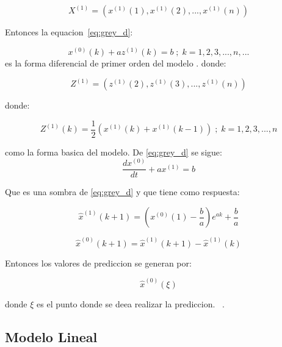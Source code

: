 \documentclass[a4paper,10pt]{article}
\begin{document}
\begin{equation}
 X^{(1)} = \left( x^{(1)}(1), x^{(1)}(2),..., x^{(1)}(n) \right)
\end{equation}

Entonces la equacion~\ref{eq:grey_d}:

\begin{equation}
 x^{(0)} (k) + az^{(1)} (k) = b \; ; \; k = 1,2,3,...,n,...
 \label{eq:grey_d}
\end{equation}
es la forma diferencial de primer orden del modelo \gm. donde:

\begin{equation}
  Z^{(1)} = \left( z^{(1)}(2), z^{(1)}(3),..., z^{(1)}(n) \right)
\end{equation}

donde:

\begin{equation}
 Z^{(1)} (k) = \frac{1}{2} ( x^{(1)}(k) + x^{(1)}(k-1) ) \; ; \;
 k = 1,2,3,...,n
\end{equation}

como la forma basica del modelo.
De \ref{eq:grey_d} se sigue:
\begin{equation}
 \frac{d x^{(0)}}{dt} + ax^{(1)} = b
 \label{eq:grey_s}
\end{equation}

Que es una sombra de \ref{eq:grey_d} y que tiene como respuesta:

\begin{equation}
\widehat{x}^{(1)} (k + 1) = \left( x^{(0)} (1) - \frac{b}{a} \right) e^{ak} + \frac{b}{a}
\end{equation}



\begin{equation}
 \widehat{x}^{(0)} (k + 1) = \widehat{x}^{(1)} (k + 1) - \widehat{x}^{(1)} (k)
\end{equation}


Entonces los valores de prediccion se generan por:

\begin{equation}
\widehat{x}^{(0)}(\xi)
\end{equation}

donde $\xi$ es el punto donde se deea realizar la prediccion.
~\cite{intro_gm}.

\subsection{Modelo Lineal}
\end{document}
